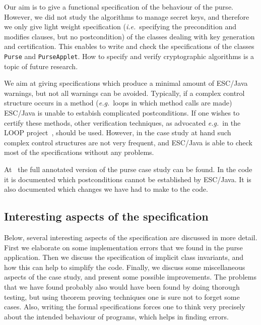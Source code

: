 \documentclass[a4paper]{llncs}
\begin{document}
Our aim is to give a functional specification of the behaviour of the
purse. However, we did not study the algorithms to manage secret keys,
and therefore we only give light weight specification
(\emph{i.e.}~specifying the precondition and modifies clauses, but no
postcondition) of the classes dealing with key generation and
certification. This enables to write and check the specifications of
the classes \texttt{Purse} and \texttt{PurseApplet}. How to specify
and verify cryptographic algorithms is a topic of future research.

We aim at giving specifications which produce a minimal amount of
ESC/Java warnings, but not all warnings can be avoided. Typically, if
a complex control structure occurs in a method (\emph{e.g.}~loops in
which method calls are made) ESC/Java is unable to estabish
complicated postconditions. If one wishes to certify these methods,
other verification techniques, as advocated \emph{e.g.}~in the LOOP
project~\cite{LOOPUrl}, should be used. However, in the case study at
hand such complex control structures are not very frequent, and
ESC/Java is able to check most of the specifications without any
problems.

At~\cite{CatanoH01Url} the full annotated version of the purse case
study can be found. In the code it is documented which postconditions
cannot be established by ESC/Java. It is also documented which changes 
we have had to make to the code.




\subsection{Interesting aspects of the specification}\label{SectSpecDetails}
Below, several interesting aspects of the specification are discussed
in more detail. First we elaborate on some implementation errors
that we found in the purse application.  Then we discuss the
specification of implicit class invariants, and how this can help to
simplify the code. Finally, we discuss some miscellaneous aspects of
the case study, and present some possible improvements. The problems
that we have found probably also would have been found by doing
thorough testing, but using theorem proving techniques one is sure not
to forget some cases. Also, writing the formal specifications forces
one to think very precisely about the intended behaviour of programs,
which helps in finding errors.
\end{document}
